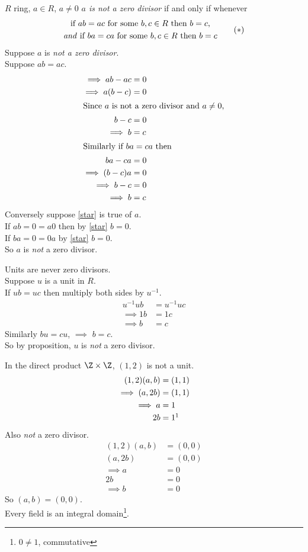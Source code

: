 \prop $R$ ring, $a\in R$, $a\neq0$
\emph{$a$ is not a zero divisor} if and only if whenever
\[
\begin{gathered}
\text{if $ab=ac$ for some $b,c\in R$ then $b=c$,} \\
\text{\emph{and} if $ba=ca$ for some $b,c\in R$ then $b=c$}
\end{gathered}
\tag{$*$}\label{star}
\]
\pf Suppose $a$ is \emph{not a zero divisor}. \\
Suppose $ab=ac$.
\begin{align*}
\implies ab-ac &= 0 \\
\implies a(b-c) &= 0 \\
\shortintertext{Since $a$ is not a zero divisor and $a\neq0$,}
b-c &= 0 \\
\implies b &= c \\
\shortintertext{Similarly if $ba=ca$ then}
ba - ca &= 0 \\
\implies (b-c)a &= 0 \\
\implies b-c &= 0 \\
\implies b &= c
\end{align*}
Conversely suppose \eqref{star} is true of $a$. \\
If $ab=0=a0$ then by \eqref{star} $b=0$. \\
If $ba=0=0a$ by \eqref{star} $b=0$. \\
So $a$ is \emph{not} a zero divisor.

\cor Units are never zero divisors. \\
\pf Suppose $u$ is a unit in $R$. \\
If $ub=uc$ then multiply both sides by $u^{-1}$.
\begin{align*}
u^{-1}ub &= u^{-1}uc \\
\implies 1b &= 1c \\
\implies b &= c
\end{align*}
Similarly $bu=cu$, $\implies$ $b=c$. \\
So by proposition, $u$ is \emph{not} a zero divisor.

\ex In the direct product $\Z\times\Z$, $(1,2)$ is not a unit.
\begin{align*}
(1,2)(a,b) &= (1,1) \\
\implies (a,2b) &= (1,1) \\
\implies a &= 1 \\
2b &= 1\footnotemark
\end{align*}%
Also \emph{not} a zero divisor.
\begin{align*}
(1,2)(a,b) &= (0,0) \\
(a,2b) &= (0,0) \\
\implies a &= 0 \\
2b &= 0 \\
\implies b &= 0
\end{align*}
So $(a,b)=(0,0)$. \\
\cor Every field is an integral domain\footnote{$0\neq1$, commutative}.

